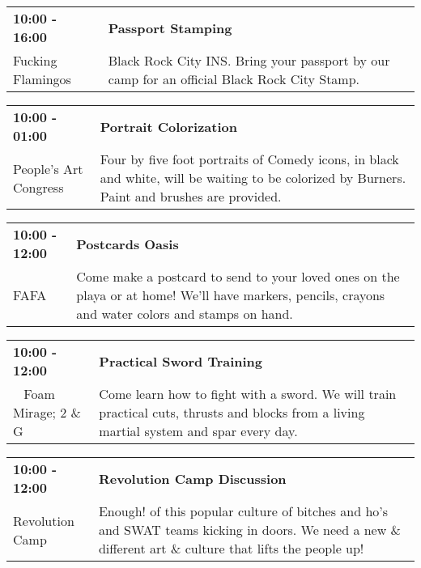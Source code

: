 \begin{tabular}{ p{1in} p{2.2in} }
    \textbf{10:00 - 16:00} & \textbf{Passport Stamping} \\
    Fucking Flamingos \newline  & Black Rock City INS. Bring your passport by our camp for an official Black Rock City Stamp. \\
    \hline 
\end{tabular}
    
\begin{tabular}{ p{1in} p{2.2in} }
    \textbf{10:00 - 01:00} & \textbf{Portrait Colorization} \\
    People's Art Congress \newline  & Four by five foot portraits of Comedy icons, in black and white, will be waiting to be colorized by Burners. Paint and brushes are provided. \\
    \hline 
\end{tabular}
    
\begin{tabular}{ p{1in} p{2.2in} }
    \textbf{10:00 - 12:00} & \textbf{Postcards Oasis} \\
    FAFA \newline  & Come make a postcard to send to your loved ones on the playa or at home! We'll have markers, pencils, crayons and water colors and stamps on hand. \\
    \hline 
\end{tabular}
    
\begin{tabular}{ p{1in} p{2.2in} }
    \textbf{10:00 - 12:00} & \textbf{Practical Sword Training} \\
    ~ \newline Foam Mirage; 2 \& G & Come learn how to fight with a sword. We will train practical cuts, thrusts and blocks from a living martial system and spar every day. \\
    \hline 
\end{tabular}
    
\begin{tabular}{ p{1in} p{2.2in} }
    \textbf{10:00 - 12:00} & \textbf{Revolution Camp Discussion} \\
    Revolution Camp \newline  & Enough! of this popular culture of bitches and ho's and SWAT teams kicking in doors. We need a new \& different art \& culture that lifts the people up! \\
    \hline 
\end{tabular}
    
